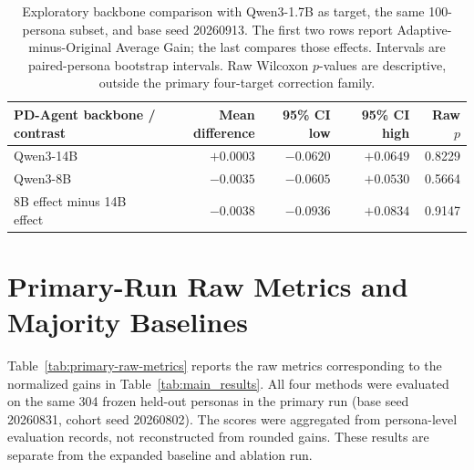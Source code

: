 \documentclass{ieeeaccess}
\begin{document}
\renewcommand{\thetable}{S4d}
\begin{table}[H]
\centering
\footnotesize
\caption{Exploratory backbone comparison with Qwen3-1.7B as target, the same 100-persona subset, and base seed 20260913. The first two rows report Adaptive-minus-Original Average Gain; the last compares those effects. Intervals are paired-persona bootstrap intervals. Raw Wilcoxon $p$-values are descriptive, outside the primary four-target correction family.}
\label{tab:backbone-results}
\begin{tabular*}{\textwidth}{@{\extracolsep{\fill}}lrrrr@{}}
\toprule
PD-Agent backbone / contrast & Mean difference & 95\% CI low & 95\% CI high & Raw $p$ \\
\midrule
Qwen3-14B & $+0.0003$ & $-0.0620$ & $+0.0649$ & 0.8229 \\
Qwen3-8B & $-0.0035$ & $-0.0605$ & $+0.0530$ & 0.5664 \\
8B effect minus 14B effect & $-0.0038$ & $-0.0936$ & $+0.0834$ & 0.9147 \\
\bottomrule
\end{tabular*}
\end{table}

\section{Primary-Run Raw Metrics and Majority Baselines}
\label{app:primary-raw-metrics}

Table~\ref{tab:primary-raw-metrics} reports the raw metrics corresponding to the normalized
gains in Table~\ref{tab:main_results}. All four methods were evaluated on the same 304
frozen held-out personas in the primary run (base seed 20260831, cohort seed 20260802).
The scores were aggregated from persona-level evaluation records, not reconstructed from
rounded gains. These results are separate from the expanded baseline and ablation run.
\end{document}
